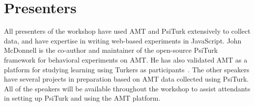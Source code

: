 \documentclass[10pt,letterpaper]{article}
\begin{document}
\section{Presenters}
All presenters of the workshop have used AMT and PsiTurk extensively to collect data, and have expertise in writing web-based experiments in JavaScript.
John McDonnell is the co-author and maintainer of the open-source PsiTurk
framework for behavioral experiments on {AMT}. He has also validated AMT as a
platform for studying learning using Turkers as
participants~\cite{crump2013evaluating}. The other speakers have several projects
in preparation based on AMT data collected using PsiTurk.
All of the speakers will be available throughout the workshop to assist attendants in setting up PsiTurk and using the AMT platform.




\setlength{\bibleftmargin}{.125in}
\setlength{\bibindent}{-\bibleftmargin}



\todos
\end{document}
